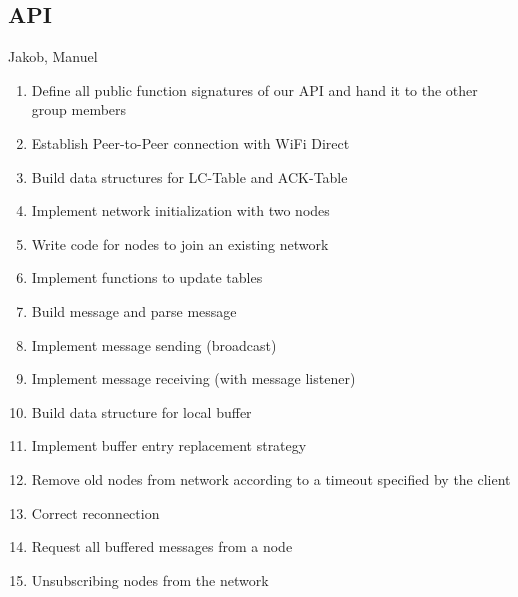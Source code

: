 	
		\subsection{API}
			Jakob, Manuel

\begin{enumerate}

\item Define all public function signatures of our API and hand it to the other group members
\item Establish Peer-to-Peer connection with WiFi Direct
\item Build data structures for LC-Table and ACK-Table
\item Implement network initialization with two nodes
\item Write code for nodes to join an existing network

\item Implement functions to update tables
\item Build message and parse message
\item Implement message sending (broadcast)


\item Implement message receiving (with message listener)
\item Build data structure for local buffer
\item Implement buffer entry replacement strategy
\item Remove old nodes from network according to a timeout specified by the client
\item Correct reconnection
\item Request all buffered messages from a node
\item Unsubscribing nodes from the network
\end{enumerate}


